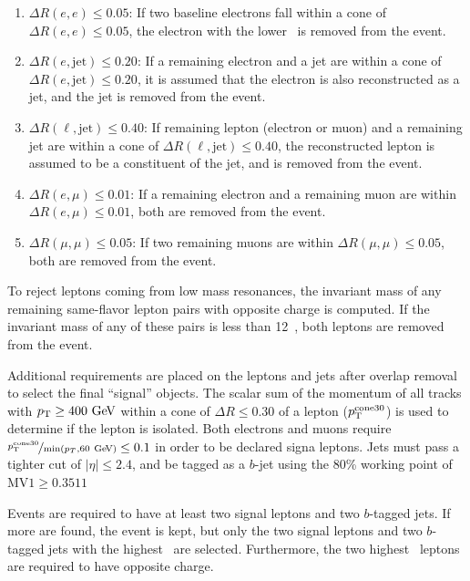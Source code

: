 \begin{enumerate}
  \item $\Delta R(e,e) \le 0.05$: If two baseline electrons fall
    within a cone of $\Delta R(e,e) \le 0.05$, the electron with the
    lower \ET\ is removed from the event.
  \item $\Delta R(e,\mathrm{jet}) \le 0.20$: If a remaining electron and a jet
    are within a cone of $\Delta R(e,\mathrm{jet}) \le 0.20$, it is
    assumed that the electron is also reconstructed as a jet, and the
    jet is removed from the event.
  \item $\Delta R(\ell,\mathrm{jet}) \le 0.40$: If remaining lepton (electron
    or muon) and a remaining jet are within a cone of
    $\Delta R(\ell,\mathrm{jet}) \le 0.40$, the reconstructed lepton is assumed
    to be a constituent of the jet, and is removed from the event.
  \item $\Delta R(e,\mu) \le 0.01$: If a remaining electron and a remaining muon
    are within $\Delta R(e,\mu) \le 0.01$, both are removed from the event.
  \item $\Delta R(\mu,\mu) \le 0.05$: If two remaining muons are within
    $\Delta R(\mu,\mu) \le 0.05$, both are removed from the event.
\end{enumerate}

To reject leptons coming from low mass resonances, the invariant mass of any
remaining same-flavor lepton pairs with opposite charge is computed.
If the invariant mass of any of these pairs is less than 12~\GeV, both leptons
are removed from the event.

Additional requirements are placed on the leptons and jets after overlap
removal to select the final ``signal'' objects.
The scalar sum of the momentum of all tracks with $\pt \geq 400 \GeV$
within a cone of $\Delta R \leq 0.30$ of a lepton ($p_{\mathrm{T}}^\mathrm{cone30}$) is
used to determine if the lepton is isolated.
Both electrons and muons require
$\nicefrac{\pT^{\mathrm{cone30}}}{\min(p_T, 60 \GeV)} \leq 0.1$ in order
to be declared signa leptons.
Jets must pass a tighter cut of $|\eta| \leq 2.4$, and be tagged as a $b$-jet
using the 80\% working point of $\mathrm{MV1} \geq 0.3511$

Events are required to have at least two signal leptons and two $b$-tagged jets.
If more are found, the event is kept, but only the two signal leptons and two
$b$-tagged jets with the highest \pt\ are selected.
Furthermore, the two highest \pt\ leptons are required to have opposite charge.

